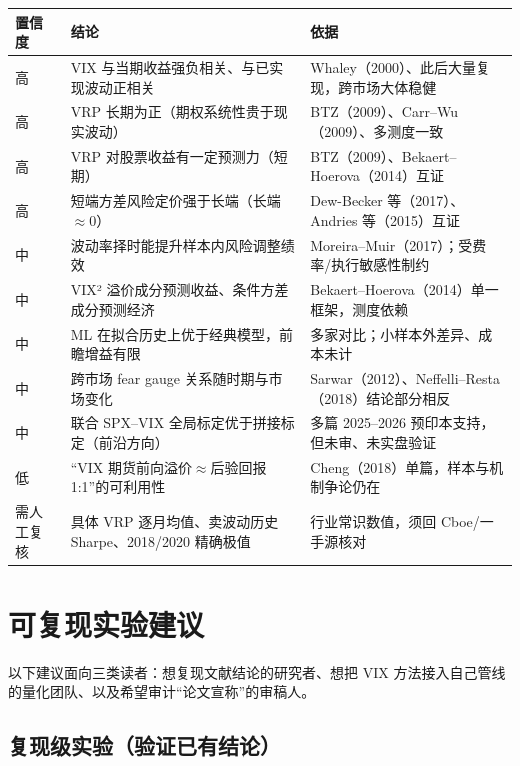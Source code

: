 \documentclass[11pt,a4paper]{article}
\begin{document}
\begin{center}
\small
\renewcommand{\arraystretch}{1.2}
\begin{tabularx}{\textwidth}{@{}l X X@{}}
\toprule
\textbf{置信度} & \textbf{结论} & \textbf{依据} \\
\midrule
高 & VIX 与当期收益强负相关、与已实现波动正相关 & Whaley（2000）、此后大量复现，跨市场大体稳健 \\
高 & VRP 长期为正（期权系统性贵于现实波动） & BTZ（2009）、Carr--Wu（2009）、多测度一致 \\
高 & VRP 对股票收益有一定预测力（短期） & BTZ（2009）、Bekaert--Hoerova（2014）互证 \\
高 & 短端方差风险定价强于长端（长端$\approx$0） & Dew-Becker 等（2017）、Andries 等（2015）互证 \\
中 & 波动率择时能提升样本内风险调整绩效 & Moreira--Muir（2017）；受费率/执行敏感性制约 \\
中 & VIX² 溢价成分预测收益、条件方差成分预测经济 & Bekaert--Hoerova（2014）单一框架，测度依赖 \\
中 & ML 在拟合历史上优于经典模型，前瞻增益有限 & 多家对比；小样本外差异、成本未计 \\
中 & 跨市场 fear gauge 关系随时期与市场变化 & Sarwar（2012）、Neffelli--Resta（2018）结论部分相反 \\
中 & 联合 SPX--VIX 全局标定优于拼接标定（前沿方向） & 多篇 2025--2026 预印本支持，但未审、未实盘验证 \\
低 & “VIX 期货前向溢价$\approx$后验回报 1:1”的可利用性 & Cheng（2018）单篇，样本与机制争论仍在 \\
需人工复核 & 具体 VRP 逐月均值、卖波动历史 Sharpe、2018/2020 精确极值 & 行业常识数值，须回 Cboe/一手源核对 \\
\bottomrule
\end{tabularx}
\end{center}

\newpage
\section{可复现实验建议}

以下建议面向三类读者：想复现文献结论的研究者、想把 VIX 方法接入自己管线的量化团队、以及希望审计“论文宣称”的审稿人。

\subsection{复现级实验（验证已有结论）}
\end{document}
